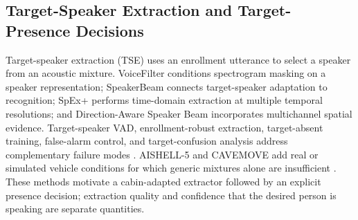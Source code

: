 \subsection{Target-Speaker Extraction and Target-Presence Decisions}
\label{subsec:tse-presence}

Target-speaker extraction (TSE) uses an enrollment utterance to select a speaker from an acoustic mixture. VoiceFilter conditions spectrogram masking on a speaker representation; SpeakerBeam connects target-speaker adaptation to recognition; SpEx+ performs time-domain extraction at multiple temporal resolutions; and Direction-Aware Speaker Beam incorporates multichannel spatial evidence. Target-speaker VAD, enrollment-robust extraction, target-absent training, false-alarm control, and target-confusion analysis address complementary failure modes \cite{voicefilter,speakerbeam,spexplus,directionaware,tsvad,satorobust,universalabsence,tsefalsealarms,targetconfusion}. AISHELL-5 and CAVEMOVE add real or simulated vehicle conditions for which generic mixtures alone are insufficient \cite{aishell5,cavemove,librimix,librispeech,visdataset}. These methods motivate a cabin-adapted extractor followed by an explicit presence decision; extraction quality and confidence that the desired person is speaking are separate quantities.

\begin{table}[H]
  \caption{Comparison of speaker extraction, activity, and target-presence research.}
  \centering
  \small
  \label{tab:tse-literature}
\end{table}

